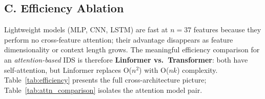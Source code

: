 \subsection{C. Efficiency Ablation}
\label{sec:efficiency_ablation}

Lightweight models (MLP, CNN, LSTM) are fast at $n=37$ features because they
perform no cross-feature attention; their advantage disappears as feature
dimensionality or context length grows.
The meaningful efficiency comparison for an \emph{attention-based} IDS is
therefore \textbf{Linformer vs.\ Transformer}: both have self-attention,
but Linformer replaces O($n^2$) with O($nk$) complexity.
Table~\ref{tab:efficiency} presents the full cross-architecture picture;
Table~\ref{tab:attn_comparison} isolates the attention model pair.


